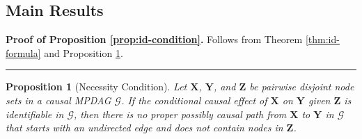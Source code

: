 \documentclass[11pt]{article}
\newcommand{\BlackBox}{\rule{1.5ex}{1.5ex}}  %
\newtheorem{proposition}[theorem]{Proposition}
\newcommand{\mb}[1]{\mathbf{#1}}
\newcommand{\g}[1][G]{\mathcal{#1}}
\newenvironment{proofof}[1][]{\noindent \textbf{Proof of #1.}}{\hfill\BlackBox}
\begin{document}

\subsection{Main Results}

\begin{proofof}[Proposition \ref{prop:id-condition}] 
    Follows from Theorem \ref{thm:id-formula} and Proposition \ref{prop:id-necessary}.
\end{proofof}


\begin{proposition}[Necessity Condition]
\label{prop:id-necessary}
    Let $\mb{X}$, $\mb{Y}$, and $\mb{Z}$ be pairwise disjoint node sets in a causal MPDAG $\g$. If the conditional causal effect of $\mb{X}$ on $\mb{Y}$ given $\mb{Z}$ is identifiable in $\g$, then there is no proper possibly causal path from $\mb{X}$ to $\mb{Y}$ in $\g$ that starts with an undirected edge and does not contain nodes in $\mb{Z}$.
\end{proposition}
\end{document}
